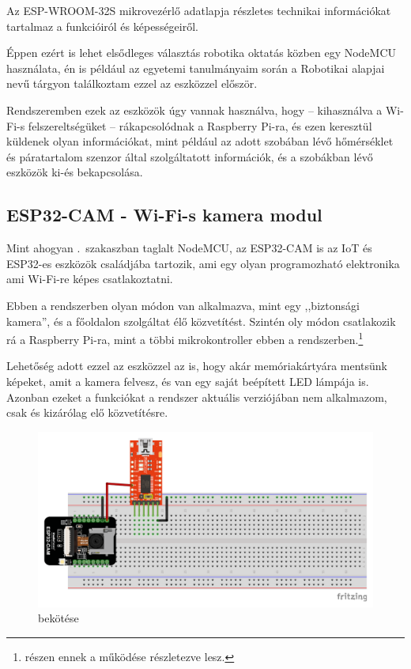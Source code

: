 \documentclass[
]{thesis-ekf}
\theoremstyle{definition}
\theoremstyle{remark}
\begin{document}
	Az ESP-WROOM-32S mikrovezérlő adatlapja részletes technikai információkat tartalmaz a funkcióiról és képességeiről.\cite{esp-32-datasheet}
	
	Éppen ezért is lehet elsődleges választás robotika oktatás közben egy NodeMCU használata, én is például az egyetemi tanulmányaim során a Robotikai alapjai nevű tárgyon találkoztam ezzel az eszközzel először.
	
	Rendszeremben ezek az eszközök úgy vannak használva, hogy -- kihasználva a Wi-Fi-s felszereltségüket -- rákapcsolódnak a Raspberry Pi-ra, és ezen keresztül küldenek olyan információkat, mint például az adott szobában lévő hőmérséklet és páratartalom szenzor által szolgáltatott információk, és a szobákban lévő eszközök ki-és bekapcsolása.
	
	\subsection{ESP32-CAM - Wi-Fi-s kamera modul}
	
	Mint ahogyan .~szakaszban taglalt NodeMCU, az ESP32-CAM is az IoT és ESP32-es eszközök családjába tartozik, ami egy olyan programozható elektronika ami Wi-Fi-re képes csatlakoztatni.
	
	Ebben a rendszerben olyan módon van alkalmazva, mint egy ,,biztonsági kamera'', és a főoldalon szolgáltat élő közvetítést. Szintén oly módon csatlakozik rá a Raspberry Pi-ra, mint a többi mikrokontroller ebben a rendszerben.\footnote{\label{later-expl-fn} részen ennek a működése részletezve lesz.}
	
	Lehetőség adott ezzel az eszközzel az is, hogy akár memóriakártyára mentsünk képeket, amit a kamera felvesz, és van egy saját beépített LED lámpája is. Azonban ezeket a funkciókat a rendszer aktuális verziójában nem alkalmazom, csak és kizárólag elő közvetítésre.
	
	\begin{figure}[ht!]
		\centering
		\includegraphics[width=1\textwidth]{./src/schematics/ESP32 CAM schematics}
		\caption{ bekötése}
		\label{esp32-cam-schematics}
	\end{figure}	
	
\end{document}
